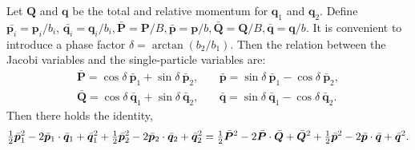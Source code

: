 \documentclass[a4paper,10pt]{article}
\newcommand{\half}[1][1] {\mathsmaller{\frac{#1}{2}}}
\begin{document}
Let $\bm Q$ and $\bm q$ be the total and relative momentum for $\bm q_1$ and $\bm q_2$. Define $\bar{\bm p_i} = \bm p_i/b_i$,
$\bar{\bm q_i} = \bm q_i/b_i, \bar{\bm P} = \bm P/B, \bar{\bm p} = \bm p/b, \bar{\bm Q} = \bm Q/B, \bar{\bm q} = \bm q/b$.
It is convenient to introduce a phase factor $\delta = \arctan(b_2/b_1)$. Then the relation between the Jacobi
variables and the single-particle variables are:
\begin{equation} \label{transformation}
  \begin{split}
  \bar{\bm{P}} = \cos\delta~\bar{\bm{p}}_1 + \sin\delta~\bar{\bm{p}}_2, &\quad 
  \bar{\bm{p}} = \sin\delta~\bar{\bm{p}}_1 - \cos\delta~\bar{\bm{p}}_2, \\
 \bar{\bm{Q}} = \cos\delta~\bar{\bm{q}}_1 + \sin\delta~\bar{\bm{q}}_2, &\quad 
  \bar{\bm{q}} = \sin\delta~\bar{\bm{q}}_1 - \cos\delta~\bar{\bm{q}}_2.
  \end{split}
\end{equation}
Then there holds the identity, 
\begin{equation}
\half\bar{\bm{p}}_1^2 - 2\bar{\bm{p}}_1\cdot \bar{\bm q}_1 + \bar{\bm q}_1^2 + \half\bar{\bm p}_2^2 - 2\bar{\bm p}_2\cdot\bar{\bm q}_2 
+ \bar{\bm q}_2^2 = 
\half\bar{\bm P}^2 - 2\bar{\bm P}\cdot\bar{\bm Q} + \bar{\bm Q}^2 + \half\bar{\bm p}^2 - 2\bar{\bm p}\cdot\bar{\bm q} 
+ \bar{\bm q}^2. 
\end{equation}
% 
% 
\end{document}
